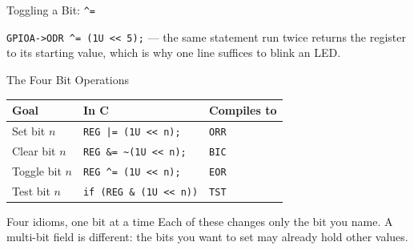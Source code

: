 \documentclass[9pt,aspectratio=169,xcolor=table]{beamer}
\newcommand{\shl}{\texttt{<{}<}}
\newcommand{\shiftx}[3]{\texttt{#1\,}#2\texttt{\,#3}}
\newcommand{\bitrow}[5]{%
    \node[rowlab] at (-0.55,#1) {#5};
    \foreach \v [count=\i from 0] in {#3}{
        \pgfmathsetmacro{\bx}{\i*0.62}
        \pgfmathtruncatemacro{\bitnum}{7-\i}
        \ifnum\bitnum=#4
            \node[#2] at (\bx,#1) {\v};
        \else
            \node[bitcell] at (\bx,#1) {\v};
        \fi
    }
}
\begin{document}
\begin{frame}{Toggling a Bit: \texttt{\^{}=}}
    \leavevmode
    \begin{center}
    \end{center}
    \vspace{2mm}
    {\small\centering \texttt{GPIOA->ODR \^{}= (1U \shl\ 5);} --- the same statement run twice returns the register to its starting value, which is why one line suffices to blink an LED.\par}
\end{frame}

\begin{frame}{The Four Bit Operations}
    \begin{center}
    {
    \striped
    \begin{tabular}{@{}l l l@{}}
        \toprule
        \textbf{Goal} & \textbf{In C} & \textbf{Compiles to} \\
        \midrule
        Set bit $n$    & \texttt{REG |= (1U \shl\ n);}      & \texttt{ORR} \\
        Clear bit $n$  & \texttt{REG \&= \textasciitilde(1U \shl\ n);} & \texttt{BIC} \\
        Toggle bit $n$ & \texttt{REG \^{}= (1U \shl\ n);}   & \texttt{EOR} \\
        Test bit $n$   & \texttt{if (REG \& (1U \shl\ n))}  & \texttt{TST} \\
        \bottomrule
    \end{tabular}}
    \end{center}

    \vspace{3mm}
    \begin{block}{Four idioms, one bit at a time}
        Each of these changes \alert{only the bit you name}. A
        multi-bit field is different: the bits you want to set may
        already hold other values.
    \end{block}
\end{frame}
\end{document}
